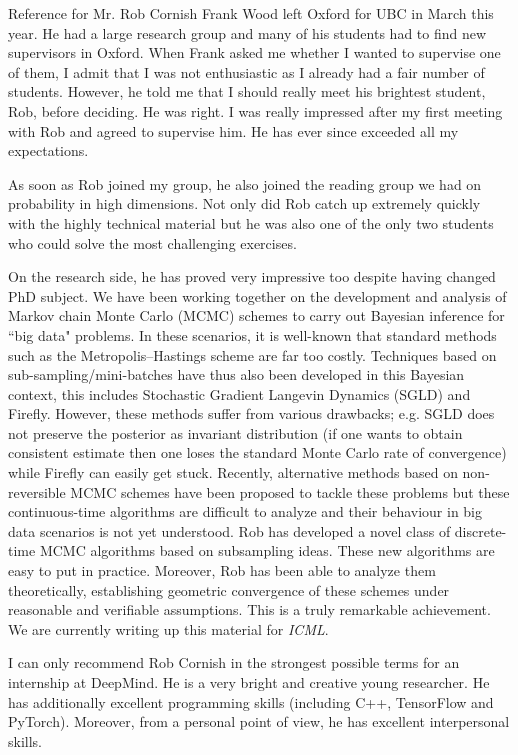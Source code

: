 \documentclass{letter}
\begin{document}
\begin{letter}{Reference for Mr. Rob Cornish}
\bigskip
Frank Wood left Oxford for UBC in March this year. He had a large research group and many of his students had to find new supervisors in Oxford.
When Frank asked me whether I wanted to supervise one of them, I admit that I was not enthusiastic as I already had a fair number of students.
However, he told me that I should really meet his brightest student, Rob, before deciding.  He was right. I was really impressed after my first meeting with Rob and agreed to supervise him. He has ever since exceeded all my expectations.

\newpage
As soon as Rob joined my group, he also joined the reading group we had on probability in high dimensions. Not only did Rob catch up extremely quickly with the highly technical material but he was also one of the only two students who could solve the most challenging exercises.

\bigskip
On the research side, he has proved very impressive too despite having changed PhD subject. We have been working together on the development and analysis of Markov chain Monte Carlo (MCMC) schemes to carry out Bayesian inference for ``big data" problems. In these scenarios, it is well-known that standard methods such as the Metropolis--Hastings scheme are far too costly. Techniques based on sub-sampling/mini-batches have thus also been developed in this Bayesian context, this includes Stochastic Gradient Langevin Dynamics (SGLD) and Firefly. However, these methods suffer from various drawbacks; e.g. SGLD does not preserve the posterior as invariant distribution (if one wants to obtain consistent estimate then one loses the standard Monte Carlo rate of convergence) while Firefly can easily get stuck. Recently, alternative methods based on non-reversible MCMC schemes have been proposed to tackle these problems but these continuous-time algorithms are difficult to analyze and their behaviour in big data scenarios is not yet understood. Rob has developed a novel class of discrete-time MCMC algorithms based on subsampling ideas. These new algorithms are easy to put in practice. Moreover, Rob has been able to analyze them theoretically, establishing geometric convergence of these schemes under reasonable and verifiable assumptions. This is a truly remarkable achievement. We are currently writing up this material for \emph{ICML}.



\bigskip
I can only recommend Rob Cornish in the strongest possible terms for an internship at DeepMind. He is a very bright and creative young researcher. He has additionally excellent programming skills (including C++, TensorFlow and PyTorch). Moreover, from a personal point of view, he has excellent interpersonal skills.


\end{letter}
\end{document}
